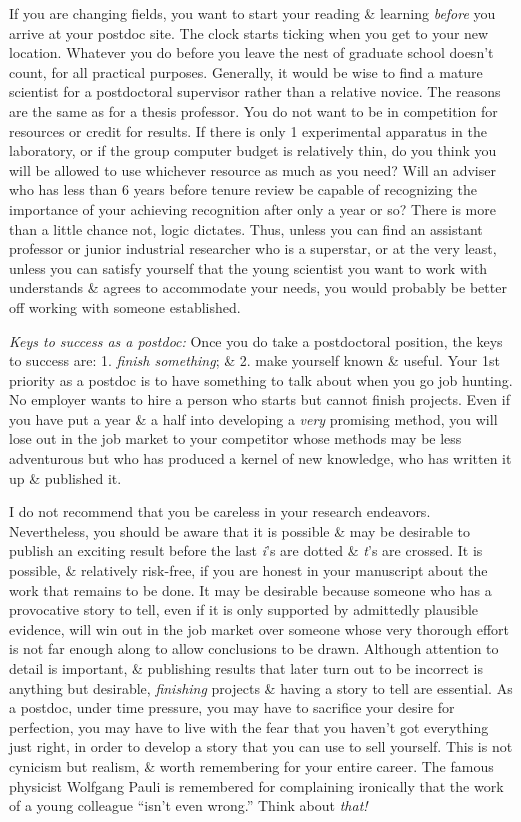 \documentclass{article}
\begin{document}
\begin{enumerate}
\begin{itemize}
\begin{itemize}
			If you are changing fields, you want to start your reading \& learning \textit{before} you arrive at your postdoc site. The clock starts ticking when you get to your new location. Whatever you do before you leave the nest of graduate school doesn't count, for all practical purposes. Generally, it would be wise to find a mature scientist for a postdoctoral supervisor rather than a relative novice. The reasons are the same as for a thesis professor. You do not want to be in competition for resources or credit for results. If there is only 1 experimental apparatus in the laboratory, or if the group computer budget is relatively thin, do you think you will be allowed to use whichever resource as much as you need? Will an adviser who has less than 6 years before tenure review be capable of recognizing the importance of your achieving recognition after only a year or so? There is more than a little chance not, logic dictates. Thus, unless you can find an assistant professor or junior industrial researcher who is a superstar, or at the very least, unless you can satisfy yourself that the young scientist you want to work with understands \& agrees to accommodate your needs, you would probably be better off working with someone established.

			\textit{Keys to success as a postdoc:} Once you do take a postdoctoral position, the keys to success are: 1. \textit{finish something}; \& 2. make yourself known \& useful. Your 1st priority as a postdoc is to have something to talk about when you go job hunting. No employer wants to hire a person who starts but cannot finish projects. Even if you have put a year \& a half into developing a \textit{very} promising method, you will lose out in the job market to your competitor whose methods may be less adventurous but who has produced a kernel of new knowledge, who has written it up \& published it.

			I do not recommend that you be careless in your research endeavors. Nevertheless, you should be aware that it is possible \& may be desirable to publish an exciting result before the last \textit{i}'s are dotted \& \textit{t}'s are crossed. It is possible, \& relatively risk-free, if you are honest in your manuscript about the work that remains to be done. It may be desirable because someone who has a provocative story to tell, even if it is only supported by admittedly plausible evidence, will win out in the job market over someone whose very thorough effort is not far enough along to allow conclusions to be drawn. Although attention to detail is important, \& publishing results that later turn out to be incorrect is anything but desirable, \textit{finishing} projects \& having a story to tell are essential. As a postdoc, under time pressure, you may have to sacrifice your desire for perfection, you may have to live with the fear that you haven't got everything just right, in order to develop a story that you can use to sell yourself. This is not cynicism but realism, \& worth remembering for your entire career. The famous physicist Wolfgang Pauli is remembered for complaining ironically that the work of a young colleague ``isn't even wrong.'' Think about \textit{that!}


\end{itemize}
\end{itemize}
\end{enumerate}
\end{document}
